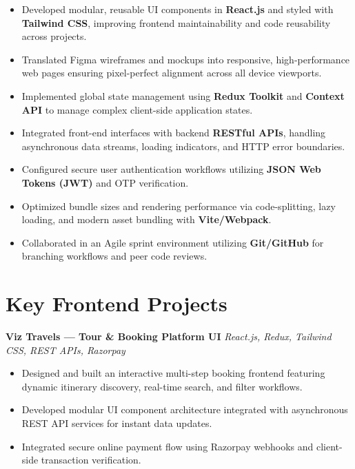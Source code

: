 \documentclass[a4paper,10pt]{article}
\begin{document}
\begin{itemize}

    \item Developed modular, reusable UI components in \textbf{React.js} and styled with \textbf{Tailwind CSS}, improving frontend maintainability and code reusability across projects.

    \item Translated Figma wireframes and mockups into responsive, high-performance web pages ensuring pixel-perfect alignment across all device viewports.

    \item Implemented global state management using \textbf{Redux Toolkit} and \textbf{Context API} to manage complex client-side application states.

    \item Integrated front-end interfaces with backend \textbf{RESTful APIs}, handling asynchronous data streams, loading indicators, and HTTP error boundaries.

    \item Configured secure user authentication workflows utilizing \textbf{JSON Web Tokens (JWT)} and OTP verification.

    \item Optimized bundle sizes and rendering performance via code-splitting, lazy loading, and modern asset bundling with \textbf{Vite/Webpack}.

    \item Collaborated in an Agile sprint environment utilizing \textbf{Git/GitHub} for branching workflows and peer code reviews.

\end{itemize}

\section*{Key Frontend Projects}

\textbf{Viz Travels --- Tour \& Booking Platform UI}
\hfill
\textit{React.js, Redux, Tailwind CSS, REST APIs, Razorpay}

\begin{itemize}

    \item Designed and built an interactive multi-step booking frontend featuring dynamic itinerary discovery, real-time search, and filter workflows.

    \item Developed modular UI component architecture integrated with asynchronous REST API services for instant data updates.

    \item Integrated secure online payment flow using Razorpay webhooks and client-side transaction verification.

\end{itemize}
\end{document}
